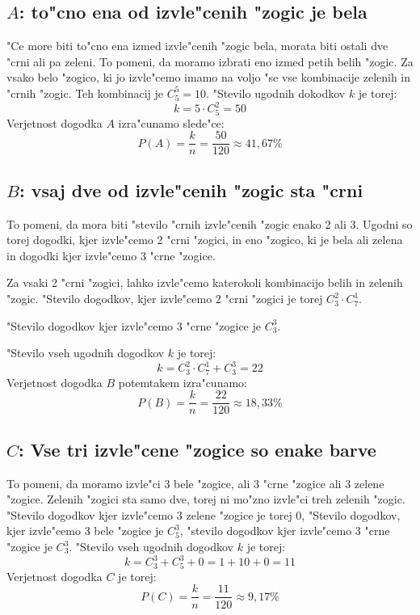 \documentclass[a4paper, 12pt]{article}
\begin{document}
\subsection*{$A$: to"cno ena od izvle"cenih "zogic je bela}
"Ce more biti to"cno ena izmed izvle"cenih "zogic bela, morata biti ostali dve "crni ali pa zeleni. To pomeni, da moramo izbrati eno izmed petih belih "zogic. Za vsako belo "zogico, ki jo izvle"cemo imamo na voljo "se vse kombinacije zelenih in "crnih "zogic. Teh kombinacij je $C_5^5 = 10$. "Stevilo ugodnih dokodkov $k$ je torej:
\begin{equation*}
k = 5 \cdot C_5^2 = 50
\end{equation*}
Verjetnost dogodka $A$ izra"cunamo slede"ce:
\begin{equation*}
P(A) = \dfrac{k}{n} = \dfrac{50}{120} \approx 41,67\%
\end{equation*}

\subsection*{$B$: vsaj dve od izvle"cenih "zogic sta "crni}
To pomeni, da mora biti "stevilo "crnih izvle"cenih "zogic enako 2 ali 3. Ugodni so torej dogodki, kjer izvle"cemo 2 "crni "zogici, in eno "zogico, ki je bela ali zelena in dogodki kjer izvle"cemo 3 "crne "zogice. 

Za vsaki 2 "crni "zogici, lahko izvle"cemo katerokoli kombinacijo belih in zelenih "zogic. "Stevilo dogodkov, kjer izvle"cemo 2 "crni "zogici je torej $C_3^2 \cdot C_7^1$.

"Stevilo dogodkov kjer izvle"cemo 3 "crne "zogice je $C_3^3$.

"Stevilo vseh ugodnih dogodkov $k$ je torej:
\begin{equation*}
k = C_3^2 \cdot C_7^1 + C_3^3 = 22
\end{equation*}
Verjetnost dogodka $B$ potemtakem izra"cunamo:
\begin{equation*}
P(B) = \dfrac{k}{n} = \dfrac{22}{120} \approx 18,33\%
\end{equation*}

\subsection*{$C$: Vse tri izvle"cene "zogice so enake barve}
To pomeni, da moramo izvle"ci 3 bele "zogice, ali 3 "crne "zogice ali 3 zelene "zogice. Zelenih "zogici sta samo dve, torej ni mo"zno izvle"ci treh zelenih "zogic. "Stevilo dogodkov kjer izvle"cemo 3 zelene "zogice je torej 0, "Stevilo dogodkov, kjer izvle"cemo 3 bele "zogice je $C_5^3$, "stevilo dogodkov kjer izvle"cemo 3 "crne "zogice je $C_3^3$. "Stevilo vseh ugodnih dogodkov $k$ je torej:
\begin{equation*}
k = C_3^3 + C_5^3 + 0 = 1 + 10 + 0 = 11
\end{equation*}
Verjetnost dogodka $C$ je torej:
\begin{equation*}
P(C) = \dfrac{k}{n} = \dfrac{11}{120} \approx 9,17\%
\end{equation*}
\end{document}

